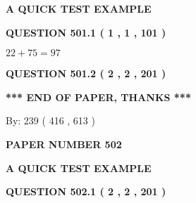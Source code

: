 \documentclass[12pt]{article}
\begin{document}
   
\vspace{0.2in}
   
   
   
   
   
   
 \vspace{0.2in}
{\LARGE {\textbf{ A QUICK TEST EXAMPLE}}}
   
   
  
\vspace{0.2in}
  
{\textbf{\Large{QUESTION
501.1 
 ( 1 , 1 , 101 )
}}}
  
  
 
 

$ %
22 +  %
75=   %
97$
 
 
  
\vspace{0.2in}
  
{\textbf{\Large{QUESTION
501.2 
 ( 2 , 2 , 201 )
}}}
  
  
   
   
 \vspace{0.2in}
 
   
   
   
   
\vspace{1.0in} 
{\textbf{\large{ *** END OF PAPER, THANKS *** }}} 
   
   
\hspace{1.0in} By: 
 239 ( 416 ,  613 )
   
   
   
   
\newpage 
\setcounter{page}{ 
   502001 } 
   
   
   
   
 {\textbf{ \Large{ PAPER NUMBER  502  }}}
   
   
\vspace{0.2in}
   
   
   
   
   
   
 \vspace{0.2in}
{\LARGE {\textbf{ A QUICK TEST EXAMPLE}}}
   
   
  
\vspace{0.2in}
  
{\textbf{\Large{QUESTION
502.1 
 ( 2 , 2 , 201 )
}}}
  
\end{document}
